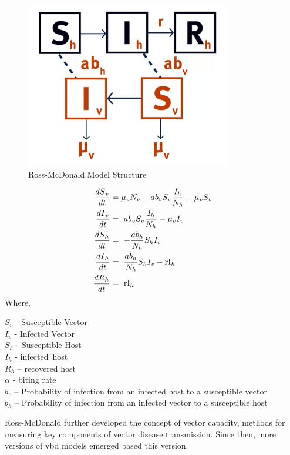 \documentclass[a4paper, 12pt, twoside]{article}
\begin{document}
\begin{figure}[htpb]
	\centering
	\includegraphics[width=0.8\textwidth]{ross-mcdonald}
	\caption{Ross-McDonald Model Structure}
	\label{fig:ross-mcdonald}
\end{figure}

\begin{align}
	\frac{{dS}_v}{dt} & = \mu_v N_v - ab_vS_v\frac{I_h}{N_h} - \mu_v S_v \\
	\frac{{dI}_v}{dt} & =\ ab_vS_v\frac{I_h}{N_h}-\mu_v I_v              \\
	\frac{{dS}_h}{dt} & =\ -\frac{ab_h}{N_h}S_hI_v                       \\
	\frac{{dI}_h}{dt} & =\ \frac{ab_h}{N_h}S_hI_v-{\rm rI}_h             \\
	\frac{{dR}_h}{dt} & =\ {\rm rI}_h
\end{align}
Where,
\begin{centering}
	$S_v$ - Susceptible Vector  \\
	$I_v$ - Infected Vector\\
	$S_h$ - Susceptible Host\\
	$I_h$ - infected\ host\\
	$R_h$ – recovered host\\
	$\alpha$ - biting rate \\
	$b_v$ – Probability of infection from an infected host to a susceptible vector\\
	$b_h$ – Probability of infection from an infected vector to a susceptible host
\end{centering}

Ross-McDonald further developed the concept of vector capacity, methods for measuring key components of vector disease transmission.
Since then, more versions of \gls{vbd} models emerged based this version.
\end{document}
